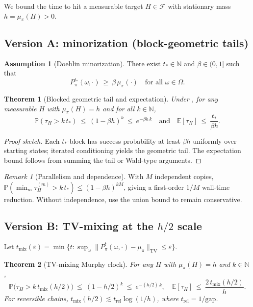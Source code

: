 \documentclass[11pt]{article}
\theoremstyle{plain}
\newtheorem{theorem}{Theorem}
\theoremstyle{definition}
\newtheorem{assumption}{Assumption}
\theoremstyle{remark}
\newtheorem{remark}{Remark}
\newcommand{\Prb}{\mathbb{P}}
\newcommand{\E}{\mathbb{E}}
\newcommand{\TV}{\mathrm{TV}}
\newcommand{\F}{\mathcal{F}}
\newcommand{\mix}{\mathrm{mix}}
\begin{document}
We bound the time to hit a measurable target $H\in \F$ with stationary mass $h=\mu_\pi(H)>0$.

\subsection{Version A: minorization (block-geometric tails)}

\begin{assumption}[Doeblin minorization]
\label{ass:minorization}
There exist $t_*\in\mathbb{N}$ and $\beta\in(0,1]$ such that
\[
P_\pi^{t_*}(\omega,\cdot)\ \ge\ \beta\,\mu_\pi(\cdot) \quad \text{for all } \omega\in\Omega.
\]
\end{assumption}

\begin{theorem}[Blocked geometric tail and expectation]
\label{thm:murphyA}
Under , for any measurable $H$ with $\mu_\pi(H)=h$ and for all $k\in\mathbb{N}$,
\[
\Prb(\tau_H>k\,t_*)\ \le\ (1-\beta h)^k\ \le\ e^{-\beta h\,k}
\quad\text{and}\quad
\E[\tau_H]\ \le\ \frac{t_*}{\beta h}.
\]
\end{theorem}

\begin{proof}[Proof sketch]
Each $t_*$-block has success probability at least $\beta h$ uniformly over starting states; iterated conditioning yields the geometric tail. The expectation bound follows from summing the tail or Wald-type arguments. \qedhere
\end{proof}

\begin{remark}[Parallelism and dependence]
With $M$ independent copies, $\Prb(\min_m \tau_H^{(m)} > k\,t_*)\le (1-\beta h)^{kM}$, giving a first-order $1/M$ wall-time reduction. Without independence, use the union bound to remain conservative.
\end{remark}

\subsection{Version B: TV-mixing at the $h/2$ scale}

Let $t_{\mix}(\varepsilon)=\min\{t:\sup_\omega \|P_\pi^t(\omega,\cdot)-\mu_\pi\|_{\TV}\le \varepsilon\}$.

\begin{theorem}[TV-mixing Murphy clock]
\label{thm:murphyB}
For any $H$ with $\mu_\pi(H)=h$ and $k\in\mathbb{N}$,
\[
\Prb\bigl(\tau_H>k\,t_{\mix}(h/2)\bigr)\ \le\ (1-h/2)^k\ \le\ e^{-(h/2)\,k},
\quad
\E[\tau_H]\ \le\ \frac{2\,t_{\mix}(h/2)}{h}.
\]
For reversible chains, $t_{\mix}(h/2)\lesssim t_{\mathrm{rel}}\log(1/h)$, where $t_{\mathrm{rel}}=1/\mathrm{gap}$.
\end{theorem}
\end{document}
